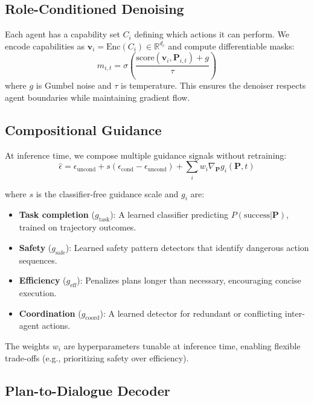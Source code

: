 \documentclass[11pt]{article}
\newcommand{\R}{\mathbb{R}}
\begin{document}
\subsection{Role-Conditioned Denoising}
\label{sec:role}

Each agent has a capability set $C_i$ defining which actions it can perform. We encode capabilities as $\mathbf{v}_i = \text{Enc}(C_i) \in \R^{d_c}$ and compute differentiable masks:
\begin{equation}
    m_{i,t} = \sigma\left(\frac{\text{score}(\mathbf{v}_i, \mathbf{P}_{i,t}) + g}{\tau}\right)
\end{equation}
where $g$ is Gumbel noise and $\tau$ is temperature. This ensures the denoiser respects agent boundaries while maintaining gradient flow.

\subsection{Compositional Guidance}
\label{sec:guidance}

At inference time, we compose multiple guidance signals without retraining:
\begin{equation}
    \hat\epsilon = \epsilon_\text{uncond} + s(\epsilon_\text{cond} - \epsilon_\text{uncond}) + \sum_i w_i \nabla_{\mathbf{P}} g_i(\mathbf{P}, t)
\end{equation}

where $s$ is the classifier-free guidance scale and $g_i$ are:

\begin{itemize}
    \item \textbf{Task completion} ($g_\text{task}$): A learned classifier predicting $P(\text{success} | \mathbf{P})$, trained on trajectory outcomes.
    \item \textbf{Safety} ($g_\text{safe}$): Learned safety pattern detectors that identify dangerous action sequences.
    \item \textbf{Efficiency} ($g_\text{eff}$): Penalizes plans longer than necessary, encouraging concise execution.
    \item \textbf{Coordination} ($g_\text{coord}$): A learned detector for redundant or conflicting inter-agent actions.
\end{itemize}

The weights $w_i$ are hyperparameters tunable at inference time, enabling flexible trade-offs (e.g., prioritizing safety over efficiency).

\subsection{Plan-to-Dialogue Decoder}
\end{document}
